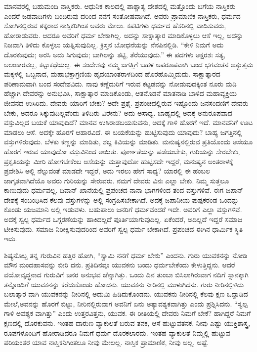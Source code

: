 ಮಾನವರಲ್ಲಿ ಬಹುಮಂದಿ ನಾಸ್ತಿಕರು. ಆಧುನಿಕ ಕಾಲದಲ್ಲಿ ಪಾಶ್ಚಾತ್ಯ ದೇಶದಲ್ಲಿ ಮತ್ತೊಂದು ಬಗೆಯ ನಾಸ್ತಿಕರು ಎಂದರೆ ಜಡವಾದಿಗಳು ಬಂದಿರುವು ದರಿಂದ ನನಗೆ ಸಂತೋಷವಾಗಿದೆ. ಅವರು ಪ್ರಾಮಾಣಿಕ ನಾಸ್ತಿಕರು, ಧರ್ಮದ ಸೋಗಿನಲ್ಲಿರುವ ಠಕ್ಕರಾದ ನಾಸ್ತಿಕರಿಗಿಂತ ಅವರು ಮೇಲು. ಕಪಟಿಗಳು ಧರ್ಮದ ಹೆಸರಿನಲ್ಲಿ ವಾದಿಸುವರು, ಹೋರಾಡುವರು. ಆದರೂ ಅವರಿಗೆ ಧರ್ಮ ಬೇಕಾಗಿಲ್ಲ. ಅದನ್ನು ಸಾಕ್ಷಾತ್ಕಾರ ಮಾಡಿಕೊಳ್ಳಲು ಆಸೆ ಇಲ್ಲ, ಅದನ್ನು ನಿಜವಾಗಿ ತಿಳಿದು ಕೊಳ್ಳಲು ಯತ್ನಿಸುವುದಿಲ್ಲ. ಕ್ರಿಸ್ತನ ಬೋಧನೆಯನ್ನು ನೆನಪಿನಲ್ಲಿಡಿ. “ಕೇಳಿ ನಿಮಗೆ ಅದು ದೊರಕುವುದು; ಅರಸಿ ಅದು ಸಿಗುವುದು; ಬಾಗಿಲನ್ನು ತಟ್ಟಿ, ತೆರೆಯುವುದು.” ಈ ಪದಗಳು ಅಕ್ಷರಶಃ ಸತ್ಯ, ಅಲಂಕಾರವಲ್ಲ, ಕಟ್ಟುಕಥೆಯಲ್ಲ. ಈ ಸಂದೇಶವು ನಮ್ಮ ಜಗತ್ತಿಗೆ ಬಹಳ ಅಪರೂಪವಾಗಿ ಬಂದ ಭಗವಂತನ ಅತ್ಯುತ್ತಮ ಮಕ್ಕಳಲ್ಲಿ ಒಬ್ಬನಾದ, ಮಹಾಭಕ್ತಾಗ್ರಣಿಯ ಹೃದಯಾಂತರಾಳದಿಂದ ಹೊರಹೊಮ್ಮಿದುದು. ಸಾಕ್ಷಾತ್ಕಾರದ ಪರಿಣಾಮವಾಗಿ ಬಂದ ಸಂದೇಶವಿದು. ನಾವು ಕಣ್ಣೆದುರಿಗೆ ಇರುವ ಕಟ್ಟಡವನ್ನು ನೋಡುವುದಕ್ಕಿಂತ ನೂರು ಮಡಿ ಹೆಚ್ಚಾಗಿ ದೇವರನ್ನು ಅನುಭವಿಸಿ, ಸಾಕ್ಷಾತ್ಕಾರ ಮಾಡಿಕೊಂಡು, ಆತನೊಡನೆ ಮಾತನಾಡಿ ಬಾಳಿದ ಮಹಾವ್ಯಕ್ತಿಯ ಜೀವನದ ಉಸಿರಿದು. ದೇವರು ಯಾರಿಗೆ ಬೇಕು? ಅದೇ ಪ್ರಶ್ನೆ. ಪ್ರಪಂಚದಲ್ಲಿರುವ ಇಷ್ಟೊಂದು ಜನಸಂದಣಿಗೆ ದೇವರು ಬೇಕು, ಅದರೂ ಸಿಕ್ಕುವುದಿಲ್ಲವೆಂದು ತಿಳಿದಿರು ವಿರೇನು? ಅದು ಅಸಾಧ್ಯ. ಬಾಹ್ಯದಲ್ಲಿ ಅದಕ್ಕೆ ಅನುರೂಪವಾದ ವಸ್ತುವಿಲ್ಲದ ಬಯಕೆ ಯಾವುದಿದೆ? ಮಾನವ ಉಸಿರಾಡಬಯಸುವನು, ಅದಕ್ಕೆ ಗಾಳಿ ಹೊರಗೆ ಇದೆ. ಮಾನವನಿಗೆ ಊಟ ಮಾಡಲು ಆಸೆ. ಅದಕ್ಕೇ ಹೊರಗೆ ಆಹಾರವಿದೆ. ಈ ಬಯಕೆಯನ್ನು ಹುಟ್ಟಿಸುವುದು ಯಾವುದು? ಬಾಹ್ಯ ಜಗತ್ತಿನಲ್ಲಿ ವಸ್ತುಗಳಿರುವುದು. ಬೆಳಕು ಕಣ್ಣನ್ನು ಮಾಡಿತು, ಶಬ್ದ ಕಿವಿಯನ್ನು ಮಾಡಿತು. ಮನುಷ್ಯನಲ್ಲಿರುವ ಪ್ರತಿಯೊಂದು ಅಸೆಯೂ ಹೊರಗೆ ಇರುವ ಯಾವುದೋ ವಸ್ತುವಿನಿಂದ ಅಯಿತು. ಪೂರ್ಣತೆಯನ್ನು ಪಡೆಯಬೇಕು, ಗುರಿಯನ್ನು ಸೇರಬೇಕು, ಪ್ರಕೃತಿಯನ್ನು ಮೀರಿ ಹೋಗಬೇಕೆಂಬ ಅಸೆಯನ್ನು ಮತ್ತಾವುದೋ ಹುಟ್ಟಿಸದೇ ಇದ್ದರೆ, ಮನುಷ್ಯನ ಅಂತರಾಳಕ್ಕೆ ಪ್ರವೇಶಿಸಿ ಅಲ್ಲಿ ನೆಲ್ಸುವಂತೆ ಮಾಡದೇ ಇದ್ದರೆ, ಅದು ಇರಲು ಹೇಗೆ ಸಾಧ್ಯ? ಯಾರಲ್ಲಿ ಈ ಹಂಬಲ ಜಾಗೃತವಾಗಿದೆಯೊ ಅವರು ಗುರಿಯನ್ನು ಸೇರುವರು. ನಮಗೆ ದೇವರು ವಿನಃ ಎಲ್ಲಾ ಬೇಕು. ನಿಮ್ಮ ಸುತ್ತಲೂ ಕಾಣುವುದು ಧರ್ಮವಲ್ಲ. ದಿವಾನ್​ ಖಾನೆಯಲ್ಲಿ ಪ್ರಪಂಚದ ನಾನಾ ಭಾಗಗಳಿಂದ ತಂದ ವಸ್ತುಗಳಿವೆ. ಈಗ ಜಪಾನ್​ ದೇಶಕ್ಕೆ ಸಂಬಂಧಿಸಿದ ಕೆಲವು ವಸ್ತುಗಳನ್ನು ಅಲ್ಲಿ ಸಂಗ್ರಹಿಸಬೇಕಾಗಿದೆ. ಅದಕ್ಕೆ ಜಪಾನೀಯ ಪುಷ್ಪಕರಂಡ ಒಂದನ್ನು ಕೊಂಡು ಯಜಮಾನಿ ಅಲ್ಲಿ ಇಡುವಳು. ಬಹುಪಾಲು ಜನರಿಗೆ ಧರ್ಮವೆಂದರೆ ಇದೇ. ಅವರಿಗೆ ಎಲ್ಲಾ ವಸ್ತುಗಳಿವೆ. ಅದಕ್ಕೆ ಸ್ವಲ್ಪ ಧರ್ಮದ ಒಗ್ಗರಣೆಯನ್ನು ಹಾಕಿದಲ್ಲದೆ ಪೂರ್ತಿಯಾಗುವುದಿಲ್ಲ. ಏಕೆಂದರೆ, ಅದಿಲ್ಲದೆ ಇದ್ದರೆ ಸಮಾಜ ಟೀಕಿಸುವುದು. ಸಮಾಜ ನಿರೀಕ್ಷಿಸುವುದರಿಂದ ಅವರಿಗೆ ಸ್ವಲ್ಪ ಧರ್ಮ ಬೇಕಾಗಿದೆ. ಪ್ರಪಂಚದ ಈಗಿನ ಧಾರ್ಮಿಕ ಸ್ಥಿತಿ ಇದು.

ಶಿಷ್ಯನೊಬ್ಬ ತನ್ನ ಗುರುವಿನ ಹತ್ತಿರ ಹೋಗಿ, “ಸ್ವಾಮಿ ನನಗೆ ಧರ್ಮ ಬೇಕು” ಎಂದನು. ಗುರು ಯುವಕನನ್ನು ನೋಡಿ ಮೌನ ಮಂದಹಾಸವನ್ನು ಬೀರಿ ದನು. ಪ್ರತಿದಿನವೂ ಯುವಕನು ಬಂದು ಧರ್ಮಬೇಕೆಂದು ಕೇಳುತ್ತಿದ್ದನು. ಆದರೆ ವಯೋವೃದ್ಧನಾದ ಗುರುವಿಗೆ ಜನರ ಅನುಭವ ಚೆನ್ನಾಗಿತ್ತು. ಒಂದು ದಿನ ತುಂಬಾ ಬಿಸಿಲಾಗಿರುವಾಗ ನದಿಗೆ ಸ್ನಾನಕ್ಕಾಗಿ ತನ್ನೊಂದಿಗೆ ಯುವಕನನ್ನು ಕರೆದುಕೊಂಡು ಹೋದನು. ಯುವಕನು ನೀರಿನಲ್ಲಿ ಮುಳುಗಿದನು. ಗುರು ನೀರಿನಲ್ಲಿಳಿದು ಬಲಾತ್ಕಾರ ವಾಗಿ ಯುವಕನನ್ನು ನೀರಿನಲ್ಲಿ ಅದುಮಿ ಹಿಡಿದುಕೊಂಡನು. ಯುವಕನು ನೀರಿನಲ್ಲಿ ಕೆಲವು ಕ್ಷಣ ಒದ್ದಾಡಿದ ಮೇಲೆ,\break ಅವನನ್ನು ಹೊರಗೆ ಬಿಟ್ಟು, ನೀರಿನಲ್ಲಿರುವಾಗ ಅವನಿಗೆ ಏನು ಅತ್ಯಾವಶ್ಯಕವಾಗಿತ್ತು ಎಂದು ಪ್ರಶ್ನಿಸಿದನು. “ಸ್ವಲ್ಪ ಗಾಳಿ ಅವಶ್ಯಕ ವಾಗಿತ್ತು” ಎಂದು ಉತ್ತರವಿತ್ತನು, ಯುವಕ. ಈ ರೀತಿಯಲ್ಲಿ ದೇವರು ನಿಮಗೆ ಬೇಕೆ? ಹಾಗಿದ್ದರೆ ನಿಮಗೆ ಕ್ಷಣದಲ್ಲಿ ದೊರಕುವನು. ಇಂತಹ ದಾರುಣ ವ್ಯಾಕುಲತೆ ಬರುವ ತನಕ, ಆಸೆ ಹುಟ್ಟುವತನಕ, ನೀವು ಎಷ್ಟು ಯುಕ್ತಿಶಾಸ್ತ್ರ, ರೂಪಗಳೊಂದಿಗೆ ಹೋರಾಡಿದರೂ ನಿಮಗೆ ಧರ್ಮ ದೊರಕಲಾರದು. ಇಂತಹ ವ್ಯಾಕುಲತೆ ನಿಮ್ಮಲ್ಲಿ ಹುಟ್ಟುವ ಪರಿಯಂತರ ಯಾವ ನಾಸ್ತಿಕನಿಗಿಂತಲೂ ನೀವು ಮೇಲಲ್ಲ. ನಾಸ್ತಿಕ ಪ್ರಾಮಾಣಿಕ, ನೀವು ಅಲ್ಲ, ಅಷ್ಟೆ.

